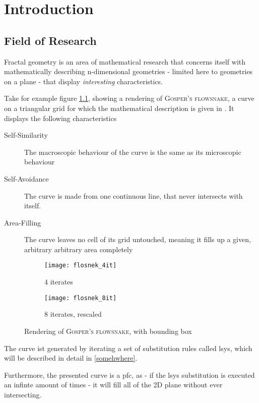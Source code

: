 \chapter{Introduction}
\label{cha:Intro}

\section{Field of Research}

Fractal geometry is an area of mathematical research that concerns itself with mathematically describing n-dimensional geometries - limited here to geometries on a plane - that display \textit{interesting} characteristics. 

Take for example figure \ref{fig:flosnek}, showing a rendering of \textsc{Gosper's flowsnake}, a curve on a triangular grid for which the mathematical description is given in \cite{Arndt2016}. It displays the following characteristics

\begin{description}
	\item [Self-Similarity] The macroscopic behaviour of the curve is the same as its microscopic behaviour
	\item [Self-Avoidance] The curve is made from one continuous line, that never intersects with itself.
	\item [Area-Filling] The curve leaves no cell of its grid untouched, meaning it fills up a given, arbitrary arbitrary area completely
\end{description}

\begin{figure}[h]
\centering
\begin{subfigure}{.5\textwidth}
  \centering
  \texttt{[image: flosnek\_4it]}
  \caption{4 iterates}
\end{subfigure}%
\begin{subfigure}{.5\textwidth}
  \centering
  \texttt{[image: flosnek\_8it]}
  \caption{8 iterates, rescaled}
\end{subfigure}
\caption{Rendering of \textsc{Gosper's flowsnake}, with \gls{bounding box}}
	\label{fig:flosnek}
\end{figure}

The curve ist generated by iterating a set of substitution rules called \gls{lsys}, which will be described in detail in \ref{somehwhere}.

Furthermore, the presented curve is a \gls{pfc}, as - if the \gls{lsys} substitution is executed an infinte amount of times - it will fill all of the 2D plane without ever intersecting.

